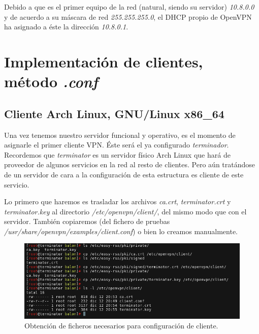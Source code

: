 \documentclass[a4paper, 11pt, titlepage]{article}
\begin{document}
        Debido a que es el primer equipo de la red (natural, siendo su servidor)
        \textit{10.8.0.0} y de acuerdo a su máscara de red \textit{255.255.255.0}, el DHCP 
        propio de OpenVPN ha asignado a éste la dirección \textit{10.8.0.1}.
        
\section{Implementación de clientes, método \textit{.conf}}

    \subsection{Cliente Arch Linux, GNU/Linux x86\_64}

        Una vez tenemos nuestro servidor funcional y operativo, es el momento de asignarle el primer 
        cliente VPN. Éste será el ya configurado \textit{terminador}. Recordemos que \textit{terminator}
        es un servidor físico Arch Linux que hará de proveedor de algunos servicios en la red al 
        resto de clientes. Pero aún tratándose de un servidor de cara a la configuración de
        esta estructura es cliente de este servicio.

        Lo primero que haremos es trasladar los archivos \textit{ca.crt}, \textit{terminator.crt}
        y \textit{terminator.key} al directorio \textit{/etc/openvpn/client/}, del mismo modo que 
        con el servidor. También copiaremos (del fichero de pruebas \textit{/usr/share/openvpn/examples/client.conf})
        o bien lo creamos manualmente.

        \begin{figure}[htp]
            \centering
            \includegraphics[width=1\textwidth]{resources/openvpn10.png}
            \caption{Obtención de ficheros necesarios para configuración de cliente.}
            \label{}
        \end{figure}   
\end{document}

